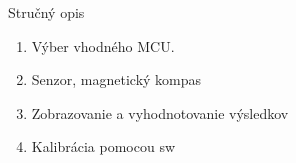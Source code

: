 \begin{snimka}
\begin{columns}[c]
    \begin{column}{0.4\textwidth}
    \begin{block}{Stručný opis}
    \begin{enumerate}
         \item <+-| alert@+> Výber vhodného MCU.
         \item <+-| alert@+> Senzor, magnetický kompas
         \item <+-| alert@+> Zobrazovanie a vyhodnotovanie výsledkov
         \item <+-| alert@+> Kalibrácia pomocou sw
    \end{enumerate}
  \end{block}
        \end{column}
  \end{columns}
\end{snimka}